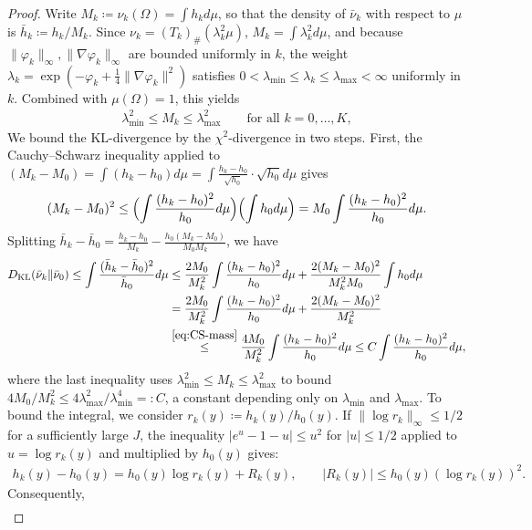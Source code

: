 \documentclass[11pt,reqno]{amsart}
\theoremstyle{definition}
\newcommand{\KL}{\mathrm{KL}}
\begin{document}
\begin{proof}
Write $M_k\coloneqq\nu_k(\Omega)=\int h_k d\mu$, so that the density of $\bar\nu_k$ with respect to $\mu$ is $\bar h_k\coloneqq h_k/M_k$. Since $\nu_k=(T_k)_\#(\lambda_k^2\mu)$, $M_k=\int\lambda_k^2 d\mu$, and because $\|\varphi_k\|_\infty,\|\nabla \varphi_k\|_\infty$ are bounded uniformly in $k$, the weight $\lambda_k=\exp(-\varphi_k+\frac1{4}\|\nabla \varphi_k\|^2)$ satisfies $0<\lambda_{\min}\le\lambda_k\le\lambda_{\max}<\infty$ uniformly in $k$. Combined with $\mu(\Omega)=1$, this yields
\begin{align}
    \lambda_{\min}^2 \le  M_k \le \lambda_{\max}^2\qquad\text{for all }k=0,\dots,K,
\end{align}
We bound the KL-divergence by the $\chi^2$-divergence in two steps. First, the Cauchy--Schwarz inequality applied to $(M_k-M_0)=\int(h_k-h_0)d\mu=\int\frac{h_k-h_0}{\sqrt{h_0}}\cdot\sqrt{h_0} d\mu$ gives
\begin{align}
    \label{eq:CS-mass}
    (M_k-M_0)^2 \le \Bigl(\int \frac{(h_k-h_0)^2}{h_0} d\mu\Bigr)\Bigl(\int h_0 d\mu\Bigr) = M_0 \int \frac{(h_k-h_0)^2}{h_0} d\mu.
\end{align}
Splitting $\bar h_k-\bar h_0=\frac{h_k-h_0}{M_k}-\frac{h_0(M_k-M_0)}{M_0 M_k}$, we have
\begin{align}
    D_\KL(\bar\nu_k\|\bar\nu_0)
    \le \int \frac{(\bar h_k-\bar h_0)^2}{\bar h_0} d\mu
    &\le \frac{2M_0}{M_k^2} \int \frac{(h_k-h_0)^2}{h_0} d\mu + \frac{2(M_k-M_0)^2}{M_k^2 M_0} \int h_0 d\mu \notag\\
    &= \frac{2M_0}{M_k^2} \int \frac{(h_k-h_0)^2}{h_0} d\mu + \frac{2(M_k-M_0)^2}{M_k^2} \notag\\
    &\stackrel{\eqref{eq:CS-mass}}{\le}\frac{4M_0}{M_k^2} \int \frac{(h_k-h_0)^2}{h_0} d\mu  \le  C \int \frac{(h_k-h_0)^2}{h_0} d\mu,
\end{align}
where the last inequality uses $\lambda_{\min}^2\le M_k\le\lambda_{\max}^2$ to bound $4M_0/M_k^2\le 4\lambda_{\max}^2/\lambda_{\min}^4=\colon C$, a constant depending only on $\lambda_{\min}$ and $\lambda_{\max}$. To bound the integral, we consider $r_k(y)\coloneqq h_k(y)/h_0(y)$. If $\|\log r_k\|_\infty\le 1/2$ for a sufficiently large $J$, the inequality $|e^u-1-u|\le u^2$ for $|u|\le 1/2$ applied to $u=\log r_k(y)$ and multiplied by $h_0(y)$ gives:
\begin{align}
    \label{eq:hk-expand}
    h_k(y)-h_0(y)  =  h_0(y) \log r_k(y) + R_k(y),
    \qquad |R_k(y)|\le h_0(y) (\log r_k(y))^2.
\end{align}
Consequently,
\begin{align}

\end{align}
\end{proof}
\end{document}
